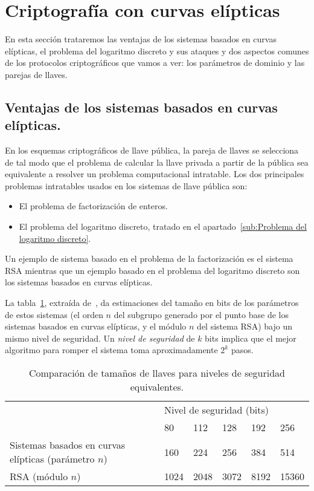\section{Criptografía con curvas elípticas}
\label{sec:Criptografía con curvas elípticas}

En esta sección trataremos las ventajas de los sistemas basados en curvas elípticas, el problema del logaritmo discreto y sus ataques y dos aspectos comunes de los protocolos criptográficos que vamos a ver: los parámetros de dominio y las parejas de llaves.

\subsection{Ventajas de los sistemas basados en curvas elípticas.}
\label{sub:Ventajas de los sistemas basados en curvas elípticas.}

En los esquemas criptográficos de llave pública, la pareja de llaves se selecciona de tal modo que el problema de calcular la llave privada a partir de la pública sea equivalente a resolver un problema computacional intratable. Los dos principales problemas intratables usados en los sistemas de llave pública son:
\begin{itemize}
    \item El problema de factorización de enteros.
    \item El problema del logaritmo discreto, tratado en el apartado~\ref{sub:Problema del logaritmo discreto}.
\end{itemize}

Un ejemplo de sistema basado en el problema de la factorización es el sistema RSA mientras que un ejemplo basado en el problema del logaritmo discreto son los sistemas basados en curvas elípticas.

La tabla~\ref{tab:comparacion llaves}, extraída de~\cite{Hankerson:2003}, da estimaciones del tamaño en bits de los parámetros de estos sistemas (el orden $n$ del subgrupo generado por el punto base de los sistemas basados en curvas elípticas, y el módulo $n$ del sistema RSA) bajo un mismo nivel de seguridad. Un \emph{nivel de seguridad} de $k$ bits implica que el mejor algoritmo para romper el sistema toma aproximadamente $2^k$ pasos.

\begin{table}[!h]
  \myfloatalign

  \begin{tabularx}{\textwidth}{Xlllll} \toprule
    & \multicolumn{5}{l}{Nivel de seguridad (bits)} \\
     & 80 & 112 & 128 & 192 & 256 \\
    \midrule
    Sistemas basados en curvas elípticas (parámetro $n$)  & 160 & 224 & 256 & 384 & 514 \\
    RSA (módulo $n$) & 1024 & 2048 & 3072 & 8192 & 15360 \\
    \bottomrule
  \end{tabularx}
  \caption{Comparación de tamaños de llaves para niveles de seguridad equivalentes.}\label{tab:comparacion llaves}
\end{table}

